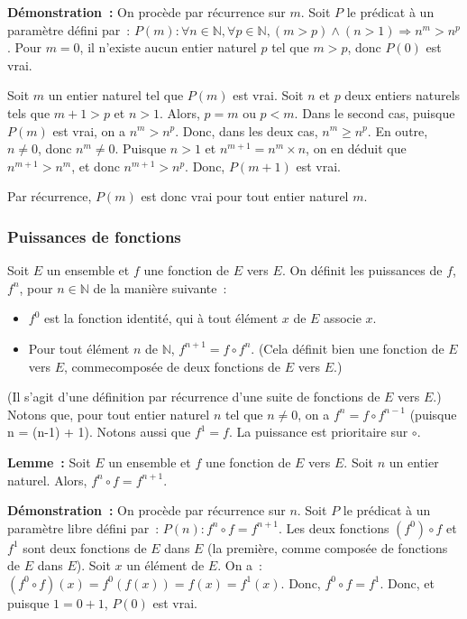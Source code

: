 \medskip

\noindent\textbf{Démonstration :} On procède par récurrence sur $m$. 
    Soit $P$ le prédicat à un paramètre défini par : $P(m): \forall n \in \mathbb{N}, \forall p \in \mathbb{N}, (m > p) \wedge (n > 1) \Rightarrow n^m > n^p$. 
    Pour $m=0$, il n'existe aucun entier naturel $p$ tel que $m > p$, donc $P(0)$ est vrai. 

    Soit $m$ un entier naturel tel que $P(m)$ est vrai. 
    Soit $n$ et $p$ deux entiers naturels tels que $m+1 > p$ et $n > 1$. 
    Alors, $p = m$ ou $p < m$. 
    Dans le second cas, puisque $P(m)$ est vrai, on a $n^m > n^p$. 
    Donc, dans les deux cas, $n^m \geq n^p$. 
    En outre, $n \neq 0$, donc $n^m \neq 0$.
    Puisque $n > 1$ et $n^{m+1} = n^m \times n$, on en déduit que $n^{m+1} > n^m$, et donc $n^{m+1} > n^p$. 
    Donc, $P(m+1)$ est vrai. 

    Par récurrence, $P(m)$ est donc vrai pour tout entier naturel $m$.

   \done 


\subsubsection{Puissances de fonctions}

Soit $E$ un ensemble et $f$ une fonction de $E$ vers $E$. 
On définit les puissances de $f$, $f^n$, pour $n \in \mathbb{N}$ de la manière suivante :
\begin{itemize}[nosep]
    \item $f^0$ est la fonction identité, qui à tout élément $x$ de $E$ associe $x$. 
    \item Pour tout élément $n$ de $\mathbb{N}$, $f^{n+1} = f \circ f^n$. 
        (Cela définit bien une fonction de $E$ vers $E$, commecomposée de deux fonctions de $E$ vers $E$.)
\end{itemize}
(Il s'agit d'une définition par récurrence d'une suite de fonctions de $E$ vers $E$.) 
Notons que, pour tout entier naturel $n$ tel que $n \neq 0$, on a $f^{n} = f \circ f^{n-1}$ (puisque n = (n-1) + 1).
Notons aussi que $f^1 = f$. 
La puissance est prioritaire sur $\circ$.

\medskip

\noindent\textbf{Lemme :} 
    Soit $E$ un ensemble et $f$ une fonction de $E$ vers $E$.
    Soit $n$ un entier naturel. 
    Alors, $f^n \circ f = f^{n+1}$.

\medskip

\noindent\textbf{Démonstration :} On procède par récurrence sur $n$. 
    Soit $P$ le prédicat à un paramètre libre défini par : $P(n): f^n \circ f = f^{n+1}$.
    Les deux fonctions $(f^0) \circ f$ et $f^1$ sont deux fonctions de $E$ dans $E$ (la première, comme composée de fonctions de $E$ dans $E$). 
    Soit $x$ un élément de $E$. 
    On a : $(f^0 \circ f)(x) = f^0(f(x)) = f(x) = f^1(x)$. 
    Donc, $f^0 \circ f = f^1$.
    Donc, et puisque $1 = 0+1$, $P(0)$ est vrai. 
    

